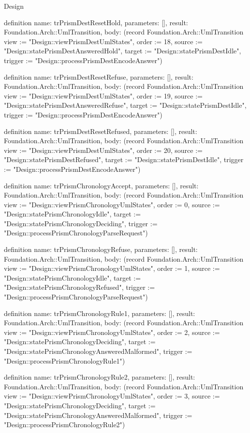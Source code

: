 \begin{lexlean}{Design}
\begin{semanticmodule}
definition{
  name: trPrismDestResetHold,
  parameters: [],
  result: Foundation.Arch::UmlTransition,
  body: (record Foundation.Arch::UmlTransition {view := "Design::viewPrismDestUmlStates", order := 18, source := "Design::statePrismDestAnsweredHold", target := "Design::statePrismDestIdle", trigger := "Design::processPrismDestEncodeAnswer"})
}

definition{
  name: trPrismDestResetRefuse,
  parameters: [],
  result: Foundation.Arch::UmlTransition,
  body: (record Foundation.Arch::UmlTransition {view := "Design::viewPrismDestUmlStates", order := 19, source := "Design::statePrismDestAnsweredRefuse", target := "Design::statePrismDestIdle", trigger := "Design::processPrismDestEncodeAnswer"})
}

definition{
  name: trPrismDestResetRefused,
  parameters: [],
  result: Foundation.Arch::UmlTransition,
  body: (record Foundation.Arch::UmlTransition {view := "Design::viewPrismDestUmlStates", order := 20, source := "Design::statePrismDestRefused", target := "Design::statePrismDestIdle", trigger := "Design::processPrismDestEncodeAnswer"})
}

definition{
  name: trPrismChronologyAccept,
  parameters: [],
  result: Foundation.Arch::UmlTransition,
  body: (record Foundation.Arch::UmlTransition {view := "Design::viewPrismChronologyUmlStates", order := 0, source := "Design::statePrismChronologyIdle", target := "Design::statePrismChronologyDeciding", trigger := "Design::processPrismChronologyParseRequest"})
}

definition{
  name: trPrismChronologyRefuse,
  parameters: [],
  result: Foundation.Arch::UmlTransition,
  body: (record Foundation.Arch::UmlTransition {view := "Design::viewPrismChronologyUmlStates", order := 1, source := "Design::statePrismChronologyIdle", target := "Design::statePrismChronologyRefused", trigger := "Design::processPrismChronologyParseRequest"})
}

definition{
  name: trPrismChronologyRule1,
  parameters: [],
  result: Foundation.Arch::UmlTransition,
  body: (record Foundation.Arch::UmlTransition {view := "Design::viewPrismChronologyUmlStates", order := 2, source := "Design::statePrismChronologyDeciding", target := "Design::statePrismChronologyAnsweredMalformed", trigger := "Design::processPrismChronologyRule1"})
}

definition{
  name: trPrismChronologyRule2,
  parameters: [],
  result: Foundation.Arch::UmlTransition,
  body: (record Foundation.Arch::UmlTransition {view := "Design::viewPrismChronologyUmlStates", order := 3, source := "Design::statePrismChronologyDeciding", target := "Design::statePrismChronologyAnsweredMalformed", trigger := "Design::processPrismChronologyRule2"})
}


\end{semanticmodule}
\end{lexlean}
